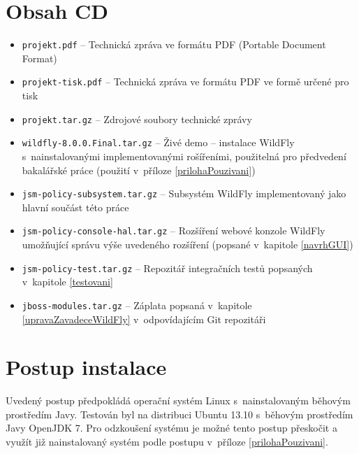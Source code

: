 \chapter{Obsah CD}

\begin{itemize}
  \item {\tt projekt.pdf} -- Technická zpráva ve formátu PDF (Portable Document Format)
  \item {\tt projekt-tisk.pdf} -- Technická zpráva ve formátu PDF ve formě určené pro tisk
  \item {\tt projekt.tar.gz} -- Zdrojové soubory technické zprávy

  \item {\tt wildfly-8.0.0.Final.tar.gz} -- Živé demo -- instalace WildFly s~nainstalovanými implementovanými rošířeními, použitelná pro předvedení bakalářské práce (použití v~příloze \ref{prilohaPouzivani})

  \item {\tt jsm-policy-subsystem.tar.gz} -- Subsystém WildFly implementovaný jako hlavní součást této práce
  \item {\tt jsm-policy-console-hal.tar.gz} -- Rozšíření webové konzole WildFly umožňující správu výše uvedeného rozšíření (popsané v~kapitole \ref{navrhGUI})
  \item {\tt jsm-policy-test.tar.gz} -- Repozitář integračních testů popsaných v~kapitole \ref{testovani}

  \item {\tt jboss-modules.tar.gz} -- Záplata popsaná v~kapitole \ref{upravaZavadeceWildFly} v~odpovídajícím Git repozitáři
\end{itemize}


\chapter{Postup instalace}\label{prilohaInstalace}

Uvedený postup předpokládá operační systém Linux s~nainstalovaným běhovým prostředím Javy. Testován byl na distribuci Ubuntu 13.10 s~běhovým prostředím Javy OpenJDK 7. Pro odzkoušení systému je možné tento postup přeskočit a využít již nainstalovaný systém podle postupu v~příloze \ref{prilohaPouzivani}.

